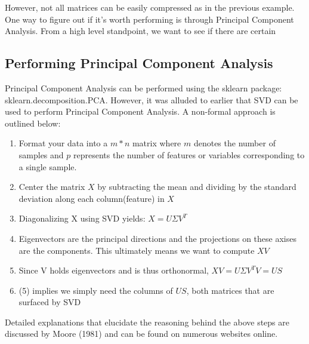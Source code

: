 \documentclass{article}
\begin{document}
However, not all matrices can be easily compressed as in the previous example. One way to figure out if it's worth performing is through Principal Component Analysis. From a high level standpoint, we want to see if there are certain 

\subsection{Performing Principal Component Analysis}
Principal Component Analysis can be performed using the sklearn package:
sklearn.decomposition.PCA. However, it was alluded to earlier that SVD can be used to perform Principal Component Analysis. A non-formal approach is outlined below:

\begin{enumerate}
\item Format your data into a $m * n$ matrix where $m$ denotes the number of samples and $p$ represents the number of features or variables corresponding to a single sample.
\item Center the matrix $X$ by subtracting the mean and dividing by the standard deviation along each column(feature) in $X$
\item Diagonalizing X using SVD yields: $X = U\Sigma V^{T}$
\item Eigenvectors are the principal directions and the projections on these axises are the components. This ultimately means we want to compute $XV$
\item Since V holds eigenvectors and is thus orthonormal, $XV = U\Sigma V^{T}V = US$
\item (5) implies we simply need the columns of $US$, both matrices that are surfaced by SVD
\end{enumerate}

Detailed explanations that elucidate the reasoning behind the above steps are discussed by Moore (1981) and can be found on numerous websites online.
\end{document}
